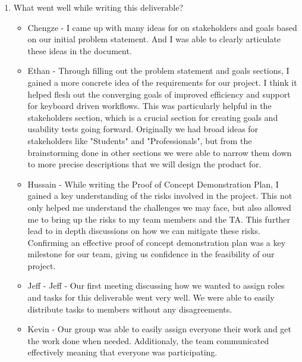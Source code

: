 \documentclass{article}
\begin{document}
\begin{enumerate}
    \item What went well while writing this deliverable? 
    \begin{itemize}
        \item Chengze - I came up with many ideas for on stakeholders 
        and goals based on our initial problem statement. And I was 
        able to clearly articulate these ideas in the document.
        \item Ethan - Through filling out the problem statement and goals
          sections, I gained a more concrete idea of the requirements for our
          project. I think it helped flesh out the converging goals of improved
          efficiency and support for keyboard driven workflows. This was
          particularly helpful in the stakeholders section, which is a crucial
          section for creating goals and usability tests going forward.
          Originally we had broad ideas for stakeholders like "Students" and
          "Professionals", but from the brainstorming done in other sections we
          were able to narrow them down to more precise descriptions that we
          will design the product for.
        \item Hussain - While writing the Proof of Concept Demonstration Plan, I 
        gained a key understanding of the risks involved in the project.
        This not only helped me understand the challenges we may face, but also
        allowed me to bring up the risks to my team members and the TA. This
        further lead to in depth discussions on how we can mitigate these risks. 
        Confirming an effective proof of concept demonstration plan was a key
        milestone for our team, giving us confidence in the feasibility of
        our project.
        \item Jeff - Jeff - Our first meeting discussing how we wanted to assign roles 
        and tasks for this deliverable went very well. 
        We were able to easily distribute tasks to members without any disagreements.
        \item Kevin - Our group was able to easily assign everyone their work 
        and get the work done when needed. Additionaly, the team communicated 
        effectively meaning that everyone was participating.
    \end{itemize}


\end{enumerate}
\end{document}
